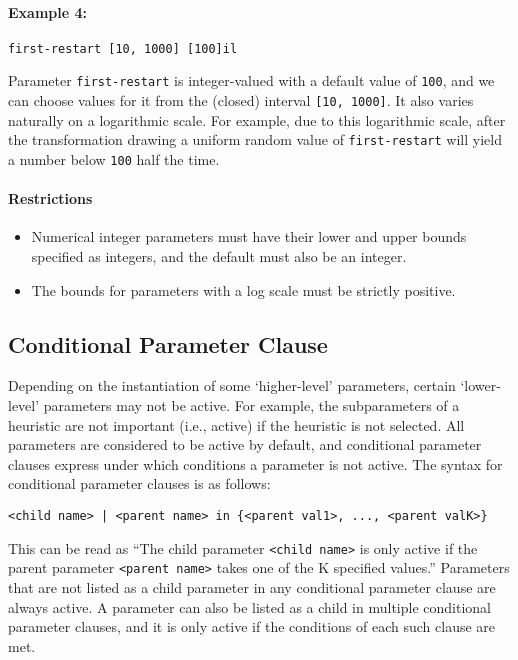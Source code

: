 \documentclass[manual.tex]{subfiles}
\begin{document}
\paragraph{Example 4:}
\begin{verbatim}
first-restart [10, 1000] [100]il
\end{verbatim}
Parameter \texttt{first-restart} is integer-valued with a default value of \texttt{100}, and we can choose values for it from the (closed) interval \texttt{[10, 1000]}.
It also varies naturally on a logarithmic scale. For example, due to this logarithmic scale, after the transformation drawing a uniform random value of \texttt{first-restart} will yield a number below \texttt{100} half the time.

\paragraph{Restrictions}
\begin{itemize} 
	\item Numerical integer parameters must have their lower and upper bounds specified as integers, and the default must also be an integer.
	\item The bounds for parameters with a log scale must be strictly positive.
\end{itemize}


\subsection{Conditional Parameter Clause}

Depending on the instantiation of some `higher-level' parameters, certain `lower-level' parameters may not be active.
For example, the subparameters of a heuristic are not important (i.e., active) if the heuristic is not selected.
%
All parameters are considered to be active by default, and conditional parameter clauses express 
under which conditions a parameter is not active. The syntax for conditional parameter clauses is as follows:

\begin{verbatim}
<child name> | <parent name> in {<parent val1>, ..., <parent valK>}
\end{verbatim}
%
This can be read as ``The child parameter \texttt{<child name>} is only active if the parent parameter \texttt{<parent name>} takes one of the K specified values.''
Parameters that are not listed as a child parameter in any conditional parameter clause are always active.
A parameter can also be listed as a child in multiple conditional parameter clauses, and it is only active if the conditions
of each such clause are met.
\end{document}

